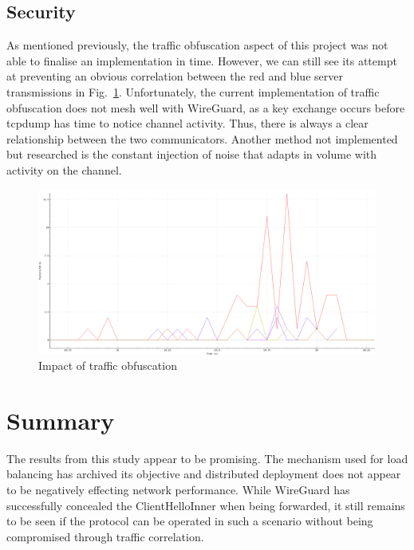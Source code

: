 \subsection{Security}

As mentioned previously, the traffic obfuscation aspect of this project was not able to finalise an implementation in time.
However, we can still see its attempt at preventing an obvious correlation between the red and blue server transmissions in Fig.~\ref{security_graph_figure}. Unfortunately, the current implementation of traffic obfuscation does not mesh well with WireGuard, as a key exchange occurs before tcpdump has time to notice channel activity. Thus, there is always a clear relationship between the two communicators. Another method not implemented but researched is the constant injection of noise that adapts in volume with activity on the channel.


\begin{figure}[ht]
\centerline{\includegraphics[width=120mm]{images/security.png}}
\caption[Impact of traffic obfuscation]{Impact of traffic obfuscation}
\label{security_graph_figure}
\end{figure}








\section{Summary}

The results from this study appear to be promising. The mechanism used for load balancing has archived its objective and distributed deployment does not appear to be negatively effecting network performance. While WireGuard has successfully concealed the ClientHelloInner when being forwarded, it still remains to be seen if the protocol can be operated in such a scenario without being compromised through traffic correlation.
